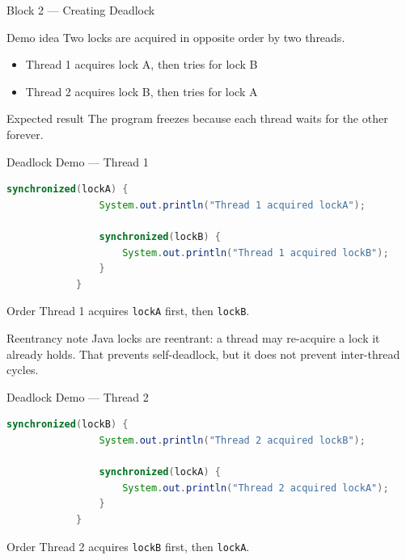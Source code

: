 \documentclass[aspectratio=169,11pt]{beamer}
\begin{document}
	\begin{frame}{Block 2 --- Creating Deadlock}
		\begin{block}{Demo idea}
			Two locks are acquired in opposite order by two threads.
		\end{block}
		
		\bigskip
		
		\begin{itemize}
			\item Thread 1 acquires lock A, then tries for lock B
			\item Thread 2 acquires lock B, then tries for lock A
		\end{itemize}
		
		\bigskip
		
		\begin{alertblock}{Expected result}
			The program freezes because each thread waits for the other forever.
		\end{alertblock}
	\end{frame}
	
	\begin{frame}[fragile]{Deadlock Demo --- Thread 1}
		\begin{lstlisting}[language=Java]
			synchronized(lockA) {
				System.out.println("Thread 1 acquired lockA");
				
				synchronized(lockB) {
					System.out.println("Thread 1 acquired lockB");
				}
			}
		\end{lstlisting}
		
		\vspace{0.3cm}
		\begin{block}{Order}
			Thread 1 acquires \texttt{lockA} first, then \texttt{lockB}.
		\end{block}
		
		\begin{alertblock}{Reentrancy note}
			Java locks are reentrant: a thread may re-acquire a lock it already holds.  
			That prevents self-deadlock, but it does not prevent inter-thread cycles.
		\end{alertblock}
	\end{frame}
	
	\begin{frame}[fragile]{Deadlock Demo --- Thread 2}
		\begin{lstlisting}[language=Java]
			synchronized(lockB) {
				System.out.println("Thread 2 acquired lockB");
				
				synchronized(lockA) {
					System.out.println("Thread 2 acquired lockA");
				}
			}
		\end{lstlisting}
		
		\vspace{0.3cm}
		\begin{block}{Order}
			Thread 2 acquires \texttt{lockB} first, then \texttt{lockA}.
		\end{block}
	\end{frame}
	
\end{document}
